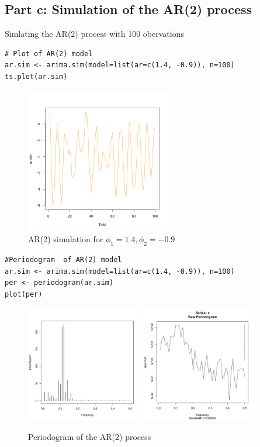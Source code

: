 \documentclass[11pt, oneside]{article}   	%
\begin{document}
\subsection{Part c: Simulation of the AR(2) process}
Simlating the AR(2) process with 100 obervations
\begin{lstlisting}
# Plot of AR(2) model
ar.sim <- arima.sim(model=list(ar=c(1.4, -0.9)), n=100)
ts.plot(ar.sim)
\end{lstlisting}
\begin{figure}[H] %
   \centering
   \includegraphics[width=2.5in]{../code/armaSimulation1.png} 
   \caption{AR(2) simulation for $\phi_{1} = 1.4, \phi_{2}= -0.9$}
   \label{fig:arma}
\end{figure}
\begin{lstlisting}
#Periodogram  of AR(2) model
ar.sim <- arima.sim(model=list(ar=c(1.4, -0.9)), n=100)
per <- periodogram(ar.sim)
plot(per)
\end{lstlisting}
\begin{figure}[H] %
   \centering
   \includegraphics[width=2in]{../code/periodogram1.pdf} 
    \includegraphics[width=2in]{../code/periodogram.png} 
   \caption{Periodogram of the AR(2) process}
   \label{fig:per}
\end{figure}
\end{document}
